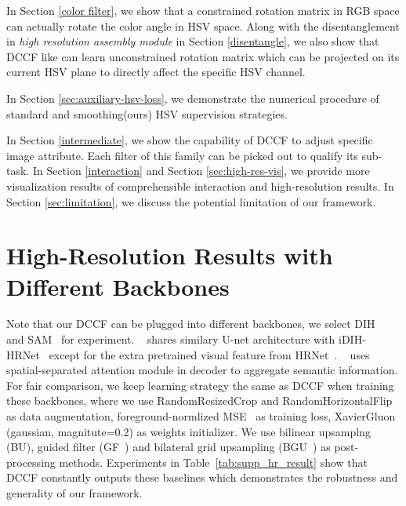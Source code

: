 \documentclass[runningheads]{llncs}
\begin{document}
In Section \ref{color filter}, we show that a constrained rotation matrix in RGB space can actually rotate the color angle in HSV space. 
Along with the disentanglement in \textit{high resolution assembly module} in Section \ref{disentangle}, we also show that DCCF like  can learn unconstrained rotation matrix which can be projected on its current HSV plane to directly affect the specific HSV channel.

In Section \ref{sec:auxiliary-hsv-loss}, we demonstrate the numerical procedure of standard and smoothing(ours) HSV supervision strategies.

In Section \ref{intermediate}, we show the capability of DCCF to adjust specific image attribute. 
Each filter of this family can be picked out to qualify its sub-task.
In Section \ref{interaction} and Section \ref{sec:high-res-vis}, we provide more visualization results of comprehensible interaction and high-resolution results.
In Section \ref{sec:limitation}, we discuss the potential limitation of our framework.


\section{High-Resolution Results with Different Backbones}
\label{sec:high-res-result}

Note that our DCCF can be plugged into different backbones, we select DIH~\cite{tsai2017deep} and SAM~\cite{cun2020improving} for experiment. 
~\cite{tsai2017deep} shares similary U-net\cite{Unet} architecture with iDIH-HRNet~\cite{sofiiuk2021foreground} except for the extra pretrained visual feature from HRNet~\cite{SunXLW19}. 
~\cite{cun2020improving} uses spatial-separated attention module in decoder to aggregate semantic information. 
For fair comparison, we keep learning strategy the same as DCCF when training these backbones, where we use RandomResizedCrop and RandomHorizontalFlip as data augmentation, foreground-normlized MSE~\cite{sofiiuk2021foreground} as training loss, XavierGluon (gaussian, magnitute=0.2) as weights initializer. 
We use bilinear upsamplng (BU), guided filter (GF~\cite{hekaiming2013GF}) and bilateral grid upsampling (BGU~\cite{chen2016bilateral}) as post-processing methods.
Experiments in Table~\ref{tab:supp_hr_result} show that DCCF constantly outputs these baselines which demonstrates the robustness and generality of our framework.
\end{document}
